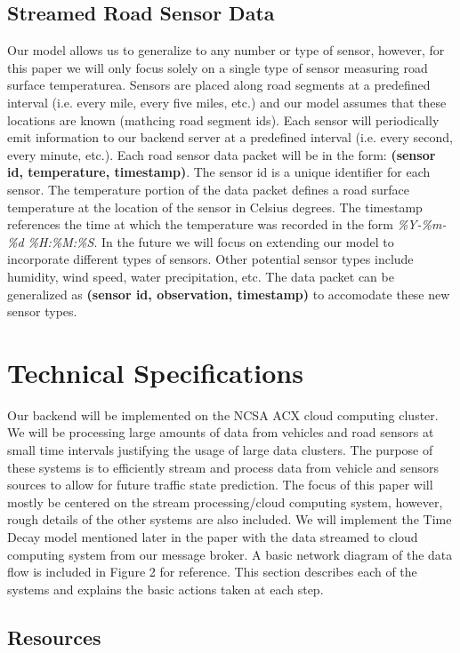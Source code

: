 \documentclass{vldb}
\begin{document}
\subsection{Streamed Road Sensor Data}
Our model allows us to generalize to any number or type of sensor, however, for this paper we will only focus solely on a single type of sensor measuring road surface temperaturea. Sensors are placed along road segments at a predefined interval (i.e. every mile, every five miles, etc.) and our model assumes that these locations are known (mathcing road segment ids). Each sensor will periodically emit information to our backend server at a predefined interval (i.e. every second, every minute, etc.). Each road sensor data packet will be in the form: \textbf{(sensor id, temperature, timestamp)}. The sensor id is a unique identifier for each sensor. The temperature portion of the data packet defines a road surface temperature at the location of the sensor in Celsius degrees. The timestamp references the time at which the temperature was recorded in the form \textit{\%Y-\%m-\%d \%H:\%M:\%S}. In the future we will focus on extending our model to incorporate different types of sensors. Other potential sensor types include humidity, wind speed, water precipitation, etc. The data packet can be generalized as \textbf{(sensor id, observation, timestamp)} to accomodate these new sensor types. 

\section{Technical Specifications}
Our backend will be implemented on the NCSA ACX cloud computing cluster. We will be processing large amounts of data from vehicles and road sensors at small time intervals justifying the usage of large data clusters. The purpose of these systems is to efficiently stream and process data from vehicle and sensors sources to allow for future traffic state prediction. The focus of this paper will mostly be centered on the stream processing/cloud computing system, however, rough details of the other systems are also included. We will implement the Time Decay model mentioned later in the paper with the data streamed to cloud computing system from our message broker. A basic network diagram of the data flow is included in Figure 2 for reference. This section describes each of the systems and explains the basic actions taken at each step.

\subsection{Resources}
\end{document}
